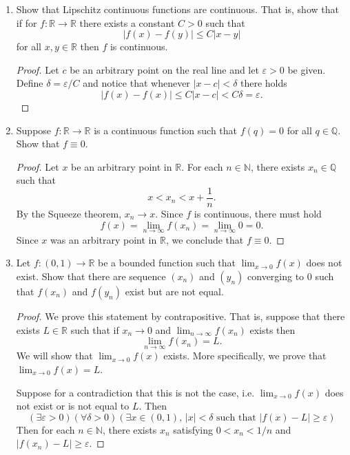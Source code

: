 \documentclass[12pt, reqno]{article}
\numberwithin{equation}{section}
\theoremstyle{definition}
\theoremstyle{remark}
\newcommand{\NN}{\mathbb{N}}
\newcommand{\QQ}{\mathbb{Q}}
\newcommand{\RR}{\mathbb{R}}
\newcommand{\abs}[1]{\left\lvert#1\right\rvert}
\renewcommand{\epsilon}{\varepsilon}
\begin{document}
\begin{enumerate}[leftmargin=*]
	\item Show that Lipschitz continuous functions are continuous. That is, show that if for $f:\RR\to \RR$ there exists a constant $C>0$ such that
	      \[
		      \abs{f(x) - f(y)} \leq C\abs{x-y}
	      \]
	      for all $x,y\in\RR$ then $f$ is continuous.

	      \begin{proof}
		      Let $c$ be an arbitrary point on the real line and let $\epsilon>0$ be given. Define $\delta = \epsilon/C$ and notice that whenever $\abs{x-c} < \delta$ there holds
		      \[
			      \abs{f(x) - f(x)} \leq C\abs{x-c} < C\delta = \epsilon.
		      \]
	      \end{proof}


	\item Suppose $f:\RR\to\RR$ is a continuous function such that $f(q) = 0$ for all $q\in \QQ$. Show that $f\equiv 0$.

	      \begin{proof}
		      Let $x$ be an arbitrary point in $\RR$. For each $n\in\NN$, there exists $x_n \in \QQ$ such that
		      \[
			      x < x_n < x+ \frac{1}{n}.
		      \]
		      By the Squeeze theorem, $x_n \to x$. Since $f$ is continuous, there must hold
		      \[
			      f(x) = \lim_{n\to\infty}f(x_n) = \lim_{n\to\infty} 0 = 0.
		      \]
		      Since $x$ was an arbitrary point in $\RR$, we conclude that $f\equiv 0$.
	      \end{proof}

	\item Let $f:(0,1)\to\RR$ be a bounded function such that $\lim_{x\to 0} f(x)$ does not exist. Show that there are sequence $(x_n)$ and $(y_n)$ converging to $0$ such that $f(x_n)$ and $f(y_n)$ exist but are not equal.

	      \begin{proof}
		      We prove this statement by contrapositive. That is, suppose that there exists $L \in \RR$ such that if $x_n\to 0$ and $\lim_{n\to\infty}f(x_n)$ exists then
		      \[
			      \lim_{n\to\infty} f(x_n) = L.
		      \]
		      We will show that $\lim_{x\to 0} f(x)$ exists. More specifically, we prove that $\lim_{x\to 0}f(x) = L$.

		      Suppose for a contradiction that this is not the case, i.e. $\lim_{x\to 0}f(x)$ does not exist or is not equal to $L$. Then
		      \[
			      (\exists \epsilon > 0)(\forall\delta>0)(\exists x\in (0,1),\, \abs{x}<\delta \text{ such that } \abs{f(x) - L} \geq \epsilon)
		      \]
		      Then for each $n\in \NN$, there exists $x_n$ satisfying $0<x_n<1/n$ and $\abs{f(x_n) - L} \geq \epsilon$.


\end{proof}
\end{enumerate}
\end{document}
